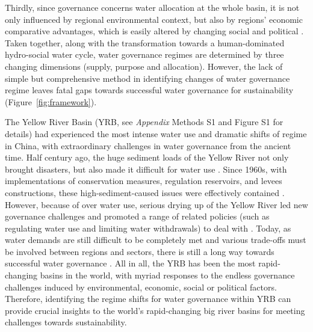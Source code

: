 \documentclass[9pt, twocolumn, twoside, lineno]{pnas-new}
\begin{document}
Thirdly, since governance concerns water allocation at the whole basin, it is not only influenced by regional environmental context, but also by regions' economic comparative advantages, which is easily altered by changing social and political
\cite{roobavannan2017,speed2013}.
Taken together, along with the transformation towards a human-dominated hydro-social water cycle, water governance regimes are determined by three changing dimensions (supply, purpose and allocation). However, the lack of simple but comprehensive method in identifying changes of water governance regime leaves fatal gaps towards successful water governance for sustainability (Figure~\ref{fig:framework}).

\label{introduction-section-3}
The Yellow River Basin (YRB, see \textit{Appendix} Methods S1 and Figure S1 for details) had experienced the most intense water use and dramatic shifts of regime in China, with extraordinary challenges in water governance from the ancient time.
Half century ago, the huge sediment loads of the Yellow River not only brought disasters, but also made it difficult for water use 
\cite{song2020,li2020}. 
Since 1960s, with implementations of conservation measures, regulation reservoirs, and levees constructions, these high-sediment-caused issues were effectively contained 
\cite{wang2016,wu2020}.
However, because of over water use, serious drying up of the Yellow River led new governance challenges and promoted a range of related policies (such as regulating water use and limiting water withdrawals) to deal with 
\cite{xia2012}.
Today, as water demands are still difficult to be completely met and various trade-offs must be involved between regions and sectors, there is still a long way towards successful water governance 
\cite{wang2019, wohlfart2016}.
All in all, the YRB has been the most rapid-changing basins in the world, with myriad responses to the endless governance challenges induced by environmental, economic, social or political factors.
Therefore, identifying the regime shifts for water governance within YRB can provide crucial insights to the world's rapid-changing big river basins for meeting challenges towards sustainability.
\end{document}
